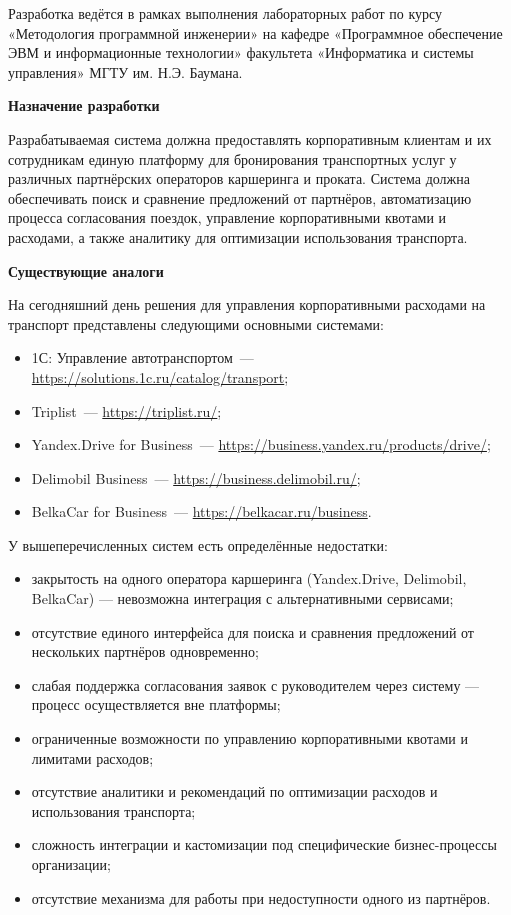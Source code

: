 \documentclass{bmstu}
\begin{document}
Разработка ведётся в рамках выполнения лабораторных работ по курсу
«Методология программной инженерии» на кафедре «Программное обеспечение ЭВМ и информационные технологии» факультета «Информатика и
системы управления» МГТУ им. Н.Э. Баумана.

\begin{center} 
    \textbf{Назначение разработки}
\end{center}

Разрабатываемая система должна предоставлять корпоративным клиентам и их сотрудникам единую платформу для бронирования транспортных услуг у различных партнёрских операторов каршеринга и проката. Система должна обеспечивать поиск и сравнение предложений от партнёров, автоматизацию процесса согласования поездок, управление корпоративными квотами и расходами, а также аналитику для оптимизации использования транспорта.

\begin{center} 
    \textbf{Существующие аналоги}
\end{center}

На сегодняшний день решения для управления корпоративными расходами на транспорт представлены следующими основными системами:

\begin{itemize}
    \item 1С: Управление автотранспортом~--- \url{https://solutions.1c.ru/catalog/transport};
    \item Triplist~--- \url{https://triplist.ru/};
    \item Yandex.Drive for Business~--- \url{https://business.yandex.ru/products/drive/};
    \item Delimobil Business~--- \url{https://business.delimobil.ru/};
    \item BelkaCar for Business~--- \url{https://belkacar.ru/business}.
\end{itemize}

У вышеперечисленных систем есть определённые недостатки:

\begin{itemize}
    \item закрытость на одного оператора каршеринга (Yandex.Drive, Delimobil, BelkaCar) — невозможна интеграция с альтернативными сервисами;
    \item отсутствие единого интерфейса для поиска и сравнения предложений от нескольких партнёров одновременно;
    \item слабая поддержка согласования заявок с руководителем через систему — процесс осуществляется вне платформы;
    \item ограниченные возможности по управлению корпоративными квотами и лимитами расходов;
    \item отсутствие аналитики и рекомендаций по оптимизации расходов и использования транспорта;
    \item сложность интеграции и кастомизации под специфические бизнес-процессы организации;
    \item отсутствие механизма для работы при недоступности одного из партнёров.
\end{itemize}
\end{document}
